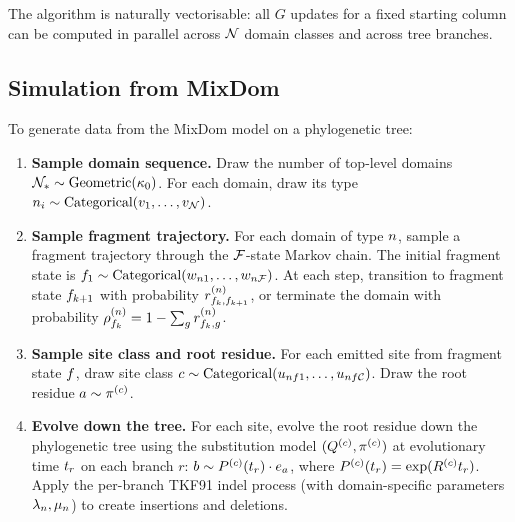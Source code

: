 The algorithm is naturally vectorisable: all $G$ updates for a fixed
starting column can be computed in parallel across $\mathcal{N}$ domain
classes and across tree branches.

\subsection{Simulation from MixDom}
\label{sec:mixdom-simulation}

To generate data from the MixDom model on a phylogenetic tree:

\begin{enumerate}
\item \textbf{Sample domain sequence.}
  Draw the number of top-level domains $\mathcal{N}_* \sim {\mbox{Geometric}}(\kappa_0)$.
  For each domain, draw its type $n_i \sim {\mbox{Categorical}}(v_1, \ldots, v_{\mathcal{N}})$.

\item \textbf{Sample fragment trajectory.}
  For each domain of type $n$, sample a fragment trajectory through the
  $\mathcal{F}$-state Markov chain. The initial fragment state is
  $f_1 \sim {\mbox{Categorical}}(w_{n 1}, \ldots, w_{n\mathcal{F}})$.
  At each step, transition to fragment state $f_{k+1}$ with probability
  $r^{(n)}_{f_k, f_{k+1}}$, or terminate the domain with probability
  $\rho^{(n)}_{f_k} = 1 - \sum_{g} r^{(n)}_{f_k, g}$.

\item \textbf{Sample site class and root residue.}
  For each emitted site from fragment state $f$, draw site class
  $c \sim {\mbox{Categorical}}(u_{nf 1}, \ldots, u_{nf\mathcal{C}})$.
  Draw the root residue $a \sim \pi^{(c)}$.

\item \textbf{Evolve down the tree.}
  For each site, evolve the root residue down the phylogenetic tree using the
  substitution model $(Q^{(c)}, \pi^{(c)})$ at evolutionary time
  $t_r$ on each branch $r$:
  $b \sim P^{(c)}(t_r) \cdot e_a$,
  where $P^{(c)}(t_r) = \exp(R^{(c)} t_r)$.
  Apply the per-branch TKF91 indel process (with domain-specific parameters
  $\lambda_n, \mu_n$) to create insertions and deletions.
\end{enumerate}
